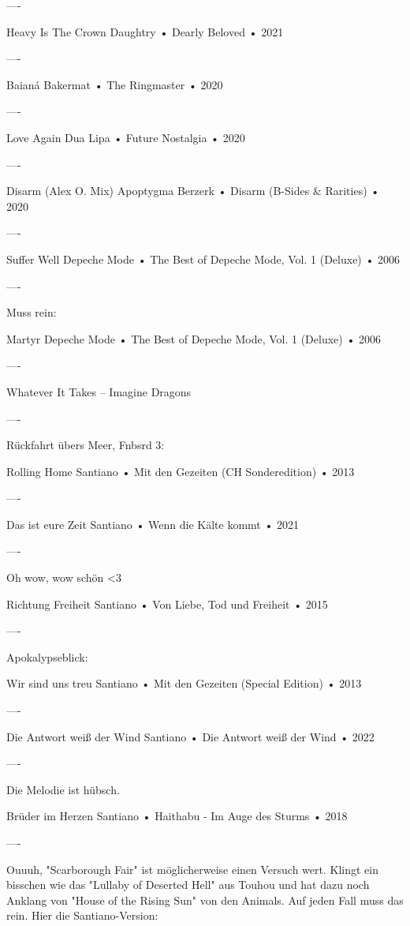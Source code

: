 ----

Heavy Is The Crown
Daughtry
 •
Dearly Beloved
 • 2021

----

Baianá
Bakermat
 •
The Ringmaster
 •
2020

----

Love Again
Dua Lipa
 •
Future Nostalgia
 •
2020

----

Disarm (Alex O. Mix)
Apoptygma Berzerk
 •
Disarm (B-Sides & Rarities)
 •
2020

----

Suffer Well
Depeche Mode
 •
The Best of Depeche Mode, Vol. 1 (Deluxe)
 •
2006

----

Muss rein:

Martyr
Depeche Mode
 •
The Best of Depeche Mode, Vol. 1 (Deluxe)
 •
2006

----

Whatever It Takes – Imagine Dragons

----

Rückfahrt übers Meer, Fnbsrd 3:

Rolling Home
Santiano
 •
Mit den Gezeiten (CH Sonderedition)
 •
2013

----

Das ist eure Zeit
Santiano
 •
Wenn die Kälte kommt
 •
2021

----

Oh wow, wow schön <3


Richtung Freiheit
Santiano
 •
Von Liebe, Tod und Freiheit
 •
2015

----

Apokalypseblick:

Wir sind uns treu
Santiano
 •
Mit den Gezeiten (Special Edition)
 •
2013

----

Die Antwort weiß der Wind
Santiano
 •
Die Antwort weiß der Wind
 •
2022

----

Die Melodie ist hübsch.

Brüder im Herzen
Santiano
 •
Haithabu - Im Auge des Sturms
 •
2018

----

Ouuuh, "Scarborough Fair" ist möglicherweise einen Versuch wert.
Klingt ein bisschen wie das "Lullaby of Deserted Hell" aus Touhou und hat dazu noch Anklang von "House of the Rising Sun" von den Animals. Auf jeden Fall muss das rein.
Hier die Santiano-Version:

